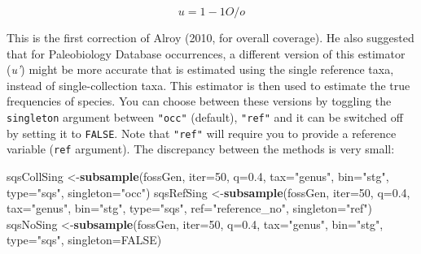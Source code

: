 \documentclass[]{article}
\newenvironment{Shaded}{\begin{snugshade}}{\end{snugshade}}
\newcommand{\KeywordTok}[1]{\textcolor[rgb]{0.13,0.29,0.53}{\textbf{{#1}}}}
\newcommand{\DataTypeTok}[1]{\textcolor[rgb]{0.13,0.29,0.53}{{#1}}}
\newcommand{\DecValTok}[1]{\textcolor[rgb]{0.00,0.00,0.81}{{#1}}}
\newcommand{\FloatTok}[1]{\textcolor[rgb]{0.00,0.00,0.81}{{#1}}}
\newcommand{\StringTok}[1]{\textcolor[rgb]{0.31,0.60,0.02}{{#1}}}
\newcommand{\OtherTok}[1]{\textcolor[rgb]{0.56,0.35,0.01}{{#1}}}
\newcommand{\NormalTok}[1]{{#1}}
\begin{document}
\[u = 1 - {1}O/o\]

This is the first correction of Alroy (2010, for overall coverage). He
also suggested that for Paleobiology Database occurrences, a different
version of this estimator (\emph{u'}) might be more accurate that is
estimated using the single reference taxa, instead of single-collection
taxa. This estimator is then used to estimate the true frequencies of
species. You can choose between these versions by toggling the
\texttt{singleton} argument between \texttt{"occ"} (default),
\texttt{"ref"} and it can be switched off by setting it to
\texttt{FALSE}. Note that \texttt{"ref"} will require you to provide a
reference variable (\texttt{ref} argument). The discrepancy between the
methods is very small:

\begin{Shaded}
\begin{Highlighting}[]
\NormalTok{sqsCollSing <-}\KeywordTok{subsample}\NormalTok{(fossGen, }\DataTypeTok{iter=}\DecValTok{50}\NormalTok{, }\DataTypeTok{q=}\FloatTok{0.4}\NormalTok{, }
  \DataTypeTok{tax=}\StringTok{"genus"}\NormalTok{, }\DataTypeTok{bin=}\StringTok{"stg"}\NormalTok{, }\DataTypeTok{type=}\StringTok{"sqs"}\NormalTok{, }
  \DataTypeTok{singleton=}\StringTok{"occ"}\NormalTok{)}
\NormalTok{sqsRefSing <-}\KeywordTok{subsample}\NormalTok{(fossGen, }\DataTypeTok{iter=}\DecValTok{50}\NormalTok{, }\DataTypeTok{q=}\FloatTok{0.4}\NormalTok{,}
  \DataTypeTok{tax=}\StringTok{"genus"}\NormalTok{, }\DataTypeTok{bin=}\StringTok{"stg"}\NormalTok{, }\DataTypeTok{type=}\StringTok{"sqs"}\NormalTok{, }\DataTypeTok{ref=}\StringTok{"reference_no"}\NormalTok{,}
  \DataTypeTok{singleton=}\StringTok{"ref"}\NormalTok{)}
\NormalTok{sqsNoSing <-}\KeywordTok{subsample}\NormalTok{(fossGen, }\DataTypeTok{iter=}\DecValTok{50}\NormalTok{, }\DataTypeTok{q=}\FloatTok{0.4}\NormalTok{,}
  \DataTypeTok{tax=}\StringTok{"genus"}\NormalTok{, }\DataTypeTok{bin=}\StringTok{"stg"}\NormalTok{, }\DataTypeTok{type=}\StringTok{"sqs"}\NormalTok{, }\DataTypeTok{singleton=}\OtherTok{FALSE}\NormalTok{)}


\end{Highlighting}
\end{Shaded}
\end{document}
